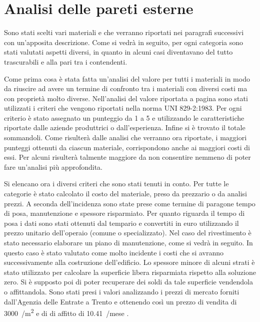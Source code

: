 \chapter{Analisi delle pareti esterne}
Sono stati scelti vari materiali e che verranno riportati nei paragrafi successivi con un'apposita descrizione.  
Come si vedrà in seguito, per ogni categoria sono stati valutati aspetti diversi, in quanto in alcuni casi diventavano del tutto trascurabili e alla pari tra i contendenti.

Come prima cosa è stata fatta un'analisi del valore per tutti i materiali in modo da riuscire ad avere un termine di confronto tra i materiali con diversi costi ma con proprietà molto diverse. 
Nell'analisi del valore riportata a pagina \pageref{fig:AnalisiValore} sono stati utilizzati i criteri che vengono riportati nella norma \textsc{UNI 829-2:1983}.
Per ogni criterio è stato assegnato un punteggio da 1 a 5  e utilizzando le caratteristiche riportate dalle aziende produttrici o dall'esperienza. 
Infine si è trovato il totale sommandoli. 
Come risulterà dalle analisi che verranno ora riportate, i maggiori punteggi ottenuti da ciascun materiale, corrispondono anche ai maggiori costi di essi.
Per alcuni risulterà talmente maggiore da non consentire nemmeno di poter fare un'analisi più approfondita.

Si elencano ora i diversi criteri che sono stati tenuti in conto.
Per tutte le categorie è stato calcolato il costo del materiale, preso da prezzario o da analisi prezzi.
A seconda dell'incidenza sono state prese come termine di paragone tempo di posa, manutenzione e spessore risparmiato.
Per quanto riguarda il tempo di posa i dati sono stati ottenuti dal tempario \textcite{grosso2007tempario} e convertiti in euro utilizzando il prezzo unitario dell'operaio (comune o specializzato). 
Nel caso del rivestimento è stato necessario elaborare un piano di manutenzione, come si vedrà in seguito. 
In questo caso è stato valutato come molto incidente i costi che si avranno successivamente alla costruzione dell'edificio.
Lo spessore minore di alcuni strati è stato utilizzato per calcolare la superficie libera risparmiata rispetto alla soluzione zero. 
Si è supposto poi di poter recuperare dei soldi da tale superficie vendendola o affittandola.
Sono stati presi i valori analizzando i prezzi di mercato forniti dall'Agenzia delle Entrate a Trento e ottenendo così un  prezzo di vendita di \SI{3000}{\teuro / \square\metre} e di di affitto di \SI{10.41}{\teuro /\square\metre mese }.


